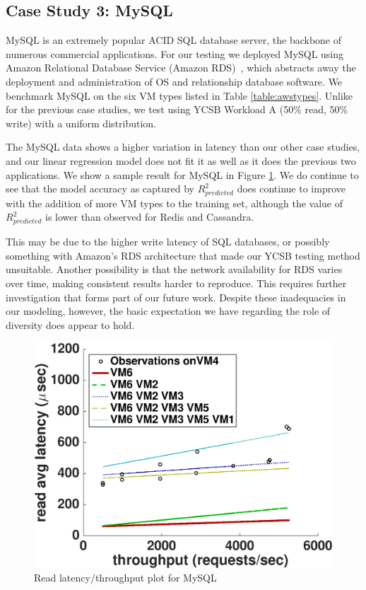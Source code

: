 \subsection{Case Study 3: MySQL}
\vspace{10pt}


MySQL is an extremely popular ACID SQL database server, the backbone of numerous commercial applications.  For our testing we deployed MySQL %
using Amazon Relational Database Service (Amazon RDS)~\cite{amazon-rds}, which abstracts away the deployment and administration of OS and relationship database software.  We benchmark MySQL %
on the six VM types listed in Table \ref{table:awstypes}.  Unlike for the previous case studies, we test using YCSB Workload A (50\% read, 50\% write) with a uniform distribution.

The MySQL data shows a higher variation in latency than our other case studies, and our linear regression model does not fit it as well as it does the previous two applications. %
We show a sample %
result for MySQL in Figure \ref{figure:mysql}. We do continue to see that the model accuracy as captured by $R^2_{predicted}$ does continue to improve with the addition of more VM types to the training set, although the value of $R^2_{predicted}$ is lower than observed for Redis and Cassandra. 

This may be due to the higher write latency of SQL databases, or possibly something with Amazon's RDS architecture that made our YCSB testing method unsuitable.  Another possibility is that the network availability for RDS varies over time, making consistent results harder to reproduce. This requires further investigation that forms part of our future work. Despite these inadequacies in our modeling, however, the basic expectation we have regarding the role of diversity does appear to hold. 

  \begin{figure}
    \centering
    \includegraphics[scale = 0.4]{mysql_fit_read_avg_latency.eps}
    \caption{Read latency/throughput plot for MySQL}
    \label{figure:mysql}
  \end{figure}

